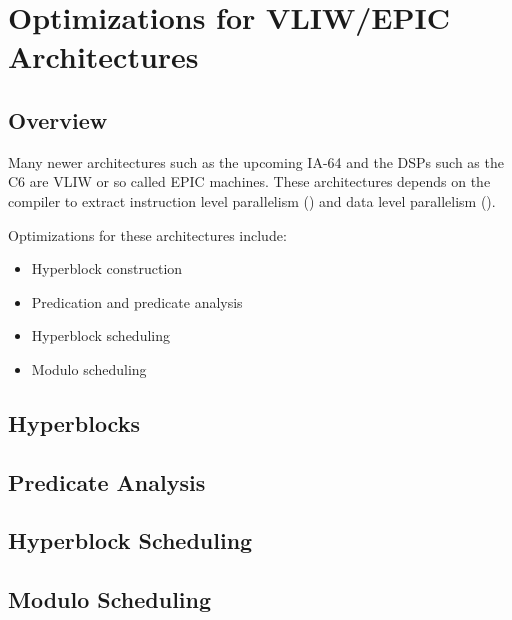 \section{Optimizations for VLIW/EPIC Architectures}

\subsection{Overview}
Many newer architectures such as the upcoming IA-64 and the
DSPs such as the C6 are VLIW or so called EPIC machines.  
These architectures depends on the compiler to 
extract instruction level parallelism ()
and data level parallelism ().

Optimizations for these architectures include:
\begin{itemize}
  \item Hyperblock construction
  \item Predication and predicate analysis
  \item Hyperblock scheduling
  \item Modulo scheduling
\end{itemize}

\subsection{Hyperblocks}
\subsection{Predicate Analysis}
\subsection{Hyperblock Scheduling}
\subsection{Modulo Scheduling}
